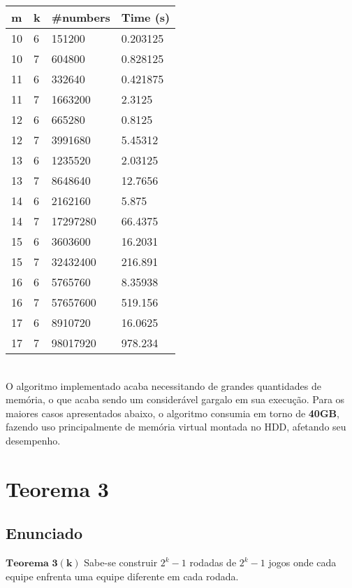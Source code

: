 \documentclass[twoside]{article}
\begin{document}
\begin{multicols}{2}
\begin{tabular}{llll}
  \toprule
  \textbf{m}  &  \textbf{k} &   \textbf{\#numbers} &  \textbf{Time (s)} \\
  \midrule
  10 &  6 &   151200    &   0.203125  \\
  10 &  7 &   604800    &   0.828125  \\
  11 &  6 &   332640    &   0.421875  \\
  11 &  7 &   1663200   &   2.3125    \\
  12 &  6 &   665280    &   0.8125    \\
  12 &  7 &   3991680   &   5.45312   \\
  13 &  6 &   1235520   &   2.03125   \\
  13 &  7 &   8648640   &   12.7656   \\
  14 &  6 &   2162160   &   5.875     \\
  14 &  7 &   17297280  &   66.4375   \\
  15 &  6 &   3603600   &   16.2031   \\
  15 &  7 &   32432400  &   216.891   \\
  16 &  6 &   5765760   &   8.35938   \\
  16 &  7 &   57657600  &   519.156   \\
  17 &  6 &   8910720   &   16.0625   \\
  17 &  7 &   98017920  &   978.234   \\
  \bottomrule 
\end{tabular}\\
\newline\newline
\indent O algoritmo implementado acaba necessitando de grandes quantidades de memória, o que acaba sendo um considerável gargalo em sua execução. Para os maiores casos apresentados abaixo, o algoritmo consumia em torno de \textbf{40GB}, fazendo uso principalmente de memória virtual montada no HDD, afetando seu desempenho.

\section{Teorema 3}

\subsection{ Enunciado }
\indent $\mathbf{Teorema}$ $\mathbf{3}$$\mathbf{(k)}$ Sabe-se construir $2^k - 1$ rodadas de $2^k - 1$ jogos onde cada equipe enfrenta uma equipe diferente em cada rodada.\\


\end{multicols}
\end{document}

